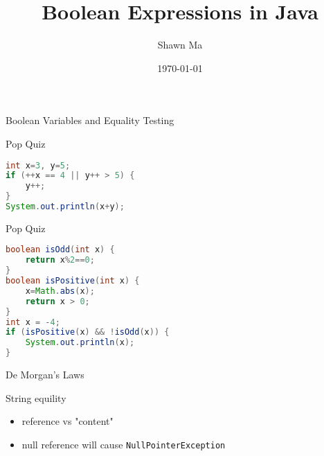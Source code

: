 \documentclass[aspectratio=169]{beamer}
\title[Boolean Expressions]{Boolean Expressions in Java}
\date{\today}
\author{Shawn Ma}
\begin{document}
\begin{frame}[fragile]{Boolean Variables and Equality Testing}
\end{frame}


\begin{frame}[fragile]{Pop Quiz}
    \begin{lstlisting}[language=Java]
int x=3, y=5;
if (++x == 4 || y++ > 5) {
    y++;
}
System.out.println(x+y);
    \end{lstlisting}
\end{frame}

\begin{frame}[fragile]{Pop Quiz}
    \begin{lstlisting}[language=Java]
boolean isOdd(int x) {
    return x%2==0;
}
boolean isPositive(int x) {
    x=Math.abs(x);
    return x > 0;
}
int x = -4;
if (isPositive(x) && !isOdd(x)) {
    System.out.println(x);
}
    \end{lstlisting}
\end{frame}

\begin{frame}[fragile]{De Morgan’s Laws}
\end{frame}


\begin{frame}[fragile]{String equility}
    \begin{itemize}
        \item reference vs "content"
        \item null reference will cause \verb|NullPointerException|
    \end{itemize}
\end{frame}
\end{document}
